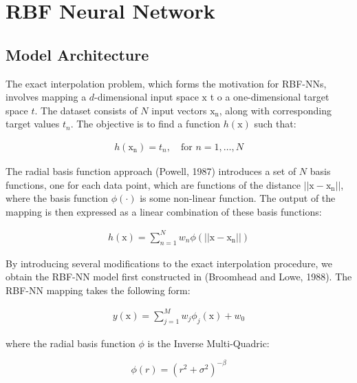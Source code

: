 \documentclass[12pt,a4paper]{article}
\begin{document}
\section{RBF Neural Network}

\subsection{Model Architecture}

The exact interpolation problem, which forms the motivation for RBF-NNs, 
involves mapping a $d$-dimensional input space $\boldsymbol{\mathrm{x}}$ t
o a one-dimensional target space $t$. The dataset consists of $N$ input
 vectors $\boldsymbol{\mathrm{x_n}}$, along with corresponding target 
 values $t_n$. The objective is to find a function
  $h(\boldsymbol{\mathrm{x}})$ such that:


\begin{align}
  h(\boldsymbol{\mathrm{x_n}}) = t_n, \quad \text{for } n = 1, \ldots, N
\end{align}

The radial basis function approach (Powell, 1987) 
introduces a set of $N$ basis functions, one for each 
data point, which are functions of the distance
$||\boldsymbol{\mathrm{x}} - \boldsymbol{\mathrm{x_n}}||$, where
the basis function $\phi(\cdot)$ is some non-linear function. The output of the mapping is then expressed as a linear combination of these basis functions:

\begin{align}
    h(\boldsymbol{\mathrm{x}}) = \sum_{n=1}^{N} w_n \phi(||\boldsymbol{\mathrm{x}} - \boldsymbol{\mathrm{x_n}}||)
\end{align}

By introducing several modifications to the exact interpolation 
procedure, we obtain the RBF-NN
model first constructed in (Broomhead and Lowe, 1988). 
The RBF-NN mapping takes the following form:

\begin{align}
    y(\boldsymbol{\mathrm{x}}) =  \sum_{j=1}^{M} w_{j} \phi_j(\boldsymbol{\mathrm{x}}) + w_{0}
\end{align}

where the radial basis function $\phi$ is the Inverse Multi-Quadric:

\[
\phi(r) = \left(r^2 + \sigma^2 \right)^{-\beta}
\]
\end{document}
